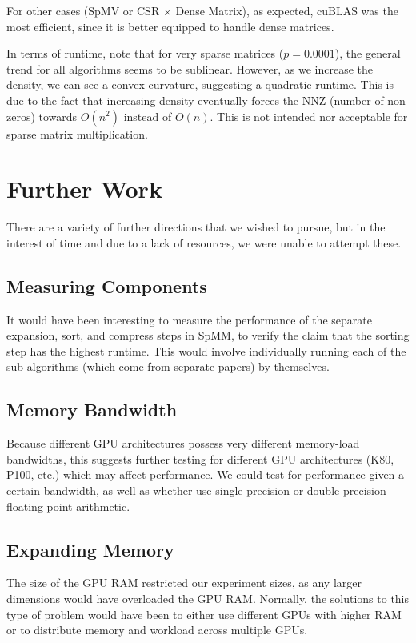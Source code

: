\documentclass[12pt]{article}
\begin{document}
\hspace{0.5cm}For other cases (SpMV or CSR $\times$ Dense Matrix), as expected, cuBLAS was the most efficient, since it is better equipped to handle dense matrices.

\hspace{0.5cm}In terms of runtime, note that for very sparse matrices ($p = 0.0001$), the general trend for all algorithms seems to be sublinear. However, as we increase the density, we can see a convex curvature, suggesting a quadratic runtime. This is due to the fact that increasing density eventually forces the NNZ (number of non-zeros) towards $O(n^{2})$ instead of $O(n)$. This is not intended nor acceptable for sparse matrix multiplication. 

\section{Further Work}
\hspace{0.5cm}There are a variety of further directions that we wished to pursue, but in the interest of time and due to a lack of resources, we were unable to attempt these.
\subsection{Measuring Components}
\hspace{0.5cm}It would have been interesting to measure the performance of the separate expansion, sort, and compress steps in SpMM, to verify the claim that the sorting step has the highest runtime. This would involve individually running each of the sub-algorithms (which come from separate papers) by themselves.

\subsection{Memory Bandwidth}
\hspace{0.5cm}Because different GPU architectures possess very different memory-load bandwidths, this suggests further testing for different GPU architectures (K80, P100, etc.) which may affect performance. We could test for performance given a certain bandwidth, as well as whether use single-precision or double precision floating point arithmetic. 

\subsection{Expanding Memory}
\hspace{0.5cm}The size of the GPU RAM restricted our experiment sizes, as any larger dimensions would have overloaded the GPU RAM. Normally, the solutions to this type of problem would have been to either use different GPUs with higher RAM or to distribute memory and workload across multiple GPUs.
\end{document}
